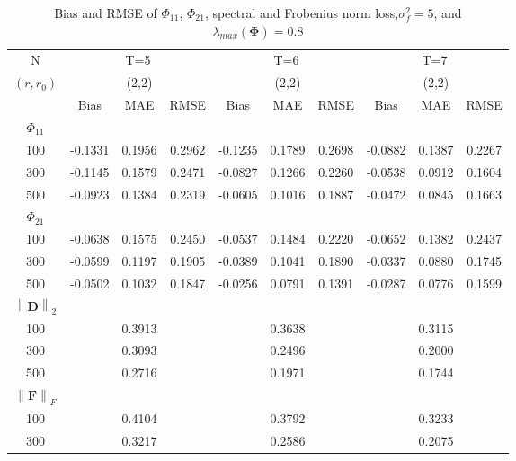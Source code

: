 \documentclass[12pt,a4paper,hyperref]{article}
\begin{document}
\begin{table}[H]
\caption{Bias and RMSE of $\Phi_{11}$, $\Phi_{21}$, spectral and Frobenius norm loss,$\sigma^{2}_{f}=5$,  and $\lambda_{max}(\boldsymbol{\Phi})=0.8$}
\centering
\tabcolsep=0.11cm
\begin{threeparttable}
\begin{tabular} {*{10}{c}}
\toprule
N& \multicolumn{3}{c}{T=5}&\multicolumn{3}{c}{T=6}&\multicolumn{3}{c}{T=7}\\
\cmidrule(lr){1-10}
$(r,r_{0})$ &   &(2,2)  &  &   &(2,2)  & &  &(2,2) & \\
\cmidrule(lr){1-4} \cmidrule(lr){5-7}\cmidrule(lr){8-10}
& \multicolumn{1}{c}{Bias} &\multicolumn{1}{c}{MAE}& \multicolumn{1}{c}{RMSE}&\multicolumn{1}{c}{Bias} &\multicolumn{1}{c}{MAE}& \multicolumn{1}{c}{RMSE}&\multicolumn{1}{c}{Bias}&\multicolumn{1}{c}{MAE} & \multicolumn{1}{c}{RMSE}\\
  \cmidrule(lr){2-4} \cmidrule(lr){5-7} \cmidrule(lr){8-10}
 $\Phi_{11}$\\
\cmidrule(lr){1-10}
 100& -0.1331&0.1956 &0.2962 & -0.1235&0.1789 & 0.2698& -0.0882& 0.1387& 0.2267\\
300&-0.1145 & 0.1579& 0.2471&-0.0827  &0.1266 &0.2260 &-0.0538 & 0.0912&0.1604\\
500& -0.0923& 0.1384&0.2319& -0.0605 & 0.1016& 0.1887&-0.0472 & 0.0845& 0.1663\\
\cmidrule(lr){1-10}
$\Phi_{21}$\\
\cmidrule(lr){1-4}   \cmidrule(lr){5-7}   \cmidrule(lr){8-10}
100& -0.0638& 0.1575& 0.2450& -0.0537 & 0.1484&0.2220 & -0.0652& 0.1382& 0.2437\\
300& -0.0599&0.1197 &0.1905 & -0.0389&0.1041 & 0.1890& -0.0337&0.0880 &0.1745\\
500&-0.0502& 0.1032& 0.1847& -0.0256 &0.0791 &0.1391 & -0.0287& 0.0776&0.1599 \\
\cmidrule(lr){1-10}
$\left\| \boldsymbol{D} \right\|_{2} $\\
\cmidrule(lr){1-4}   \cmidrule(lr){5-7}   \cmidrule(lr){8-10}
100& &0.3913& &  & 0.3638& & &0.3115 & \\
300& &0.3093 & &  & 0.2496& & & 0.2000&\\
500& & 0.2716& &  & 0.1971& & & 0.1744& \\
\cmidrule(lr){1-10}
$\left\| \boldsymbol{F} \right\|_{F} $\\
\cmidrule(lr){1-4}   \cmidrule(lr){5-7}   \cmidrule(lr){8-10}
100& & 0.4104& &  &0.3792 & & &0.3233 & \\
300& &0.3217 & &  &0.2586 & & &0.2075 &\\

\end{tabular}
\end{threeparttable}
\end{table}
\end{document}
